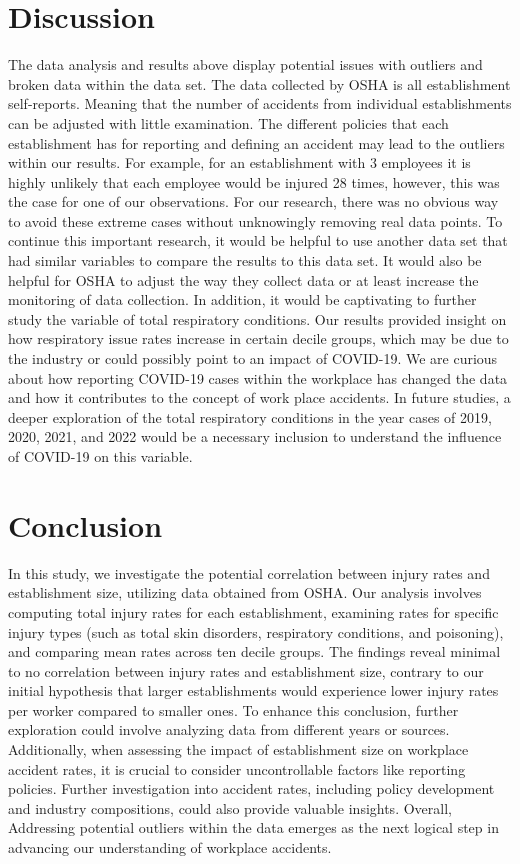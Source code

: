 \documentclass[12pt]{article}
\begin{document}
\section{Discussion}
\label{sec:discussion}

 The data analysis and results above display potential issues with outliers and broken data within the data set. The data collected by OSHA is all establishment self-reports. Meaning that the number of accidents from individual establishments can be adjusted with little examination. The different policies that each establishment has for reporting and defining an accident may lead to the outliers within our results. For example, for an establishment with 3 employees it is highly unlikely that each employee would be injured 28 times, however, this was the case for one of our observations. For our research, there was no obvious way to avoid these extreme cases without unknowingly removing real data points. To continue this important research, it would be helpful to use another data set that had similar variables to compare the results to this data set. It would also be helpful for OSHA to adjust the way they collect data or at least increase the monitoring of data collection. In addition, it would be captivating to further study the variable of total respiratory conditions. Our results provided insight on how respiratory issue rates increase in certain decile groups, which may be due to the industry or could possibly point to an impact of COVID-19. We are curious about how reporting COVID-19 cases within the workplace has changed the data and how it contributes to the concept of work place accidents. In future studies, a deeper exploration of the total respiratory conditions in the year cases of 2019, 2020, 2021, and 2022 would be a necessary inclusion to understand the influence of COVID-19 on this variable. 


\section{Conclusion}
\label{sec:conclusion}

In this study, we investigate the potential correlation between injury rates and establishment size, utilizing data obtained from OSHA. Our analysis involves computing total injury rates for each establishment, examining rates for specific injury types (such as total skin disorders, respiratory conditions, and poisoning), and comparing mean rates across ten decile groups. The findings reveal minimal to no correlation between injury rates and establishment size, contrary to our initial hypothesis that larger establishments would experience lower injury rates per worker compared to smaller ones. To enhance this conclusion, further exploration could involve analyzing data from different years or sources. Additionally, when assessing the impact of establishment size on workplace accident rates, it is crucial to consider uncontrollable factors like reporting policies. Further investigation into  accident rates, including policy development and industry compositions, could also provide valuable insights. Overall, Addressing potential outliers within the data emerges as the next logical step in advancing our understanding of workplace accidents.
\end{document}
